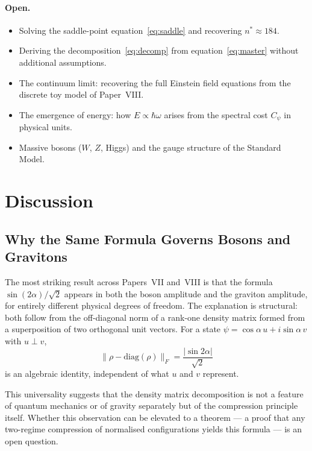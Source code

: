 \documentclass[11pt]{article}
\begin{document}
\paragraph{Open.}
\begin{itemize}
  \item Solving the saddle-point equation~\eqref{eq:saddle} and
        recovering $n^* \approx 184$.
  \item Deriving the decomposition~\eqref{eq:decomp} from
        equation~\eqref{eq:master} without additional assumptions.
  \item The continuum limit: recovering the full Einstein field
        equations from the discrete toy model of Paper~VIII.
  \item The emergence of energy: how $E \propto \hbar\omega$ arises
        from the spectral cost $C_\psi$ in physical units.
  \item Massive bosons ($W$, $Z$, Higgs) and the gauge structure of
        the Standard Model.
\end{itemize}

\section{Discussion}
\label{sec:discussion}

\subsection{Why the Same Formula Governs Bosons and Gravitons}

The most striking result across Papers~VII and~VIII is that the formula
$\sin(2\alpha)/\sqrt{2}$ appears in both the boson amplitude and the
graviton amplitude, for entirely different physical degrees of freedom.
The explanation is structural: both follow from the off-diagonal norm
of a rank-one density matrix formed from a superposition of two
orthogonal unit vectors.
For a state $\psi = \cos\alpha\,u + i\sin\alpha\,v$ with $u \perp v$,
\[
  \|\rho - \mathrm{diag}(\rho)\|_F = \frac{|\sin 2\alpha|}{\sqrt{2}}
\]
is an algebraic identity, independent of what $u$ and $v$ represent.

This universality suggests that the density matrix decomposition is not
a feature of quantum mechanics or of gravity separately but of the
compression principle itself.
Whether this observation can be elevated to a theorem --- a proof that
any two-regime compression of normalised configurations yields this
formula --- is an open question.
\end{document}
